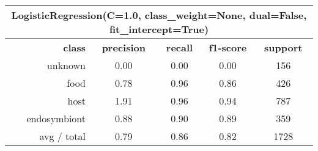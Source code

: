\begin{table}
	\begin{tabular}{|r|c|c|c|c|}
		\hline
		\multicolumn{5}{c}{LogisticRegression(C=1.0, class\_weight=None, dual=False, fit\_intercept=True)}\\
		\hline
		\textbf{class}		& \textbf{precision}  &  \textbf{recall}  & \textbf{f1-score}  &  \textbf{support} \\
		unknown   	&    0.00 	 &   0.00   &    0.00   &   156   \\
		food      	&    0.78 	 &   0.96   &    0.86   &   426   \\
		host      	&    1.91    &   0.96   &    0.94   &   787   \\
		endosymbiont&    0.88    &   0.90   &    0.89   &   359   \\
		\hline
		avg / total &    0.79    &   0.86   &    0.82   &   1728  \\
		\hline
	\end{tabular}
\end{table}
